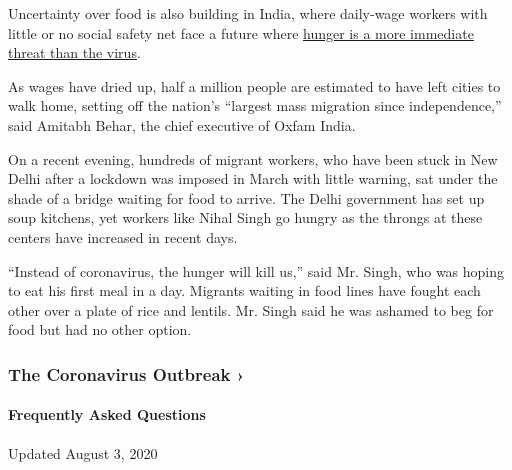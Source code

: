 Uncertainty over food is also building in India, where daily-wage
workers with little or no social safety net face a future where
\href{https://www.nytimes.com/2020/03/30/world/asia/coronavirus-india-lockdown.html}{hunger
is a more immediate threat than the virus}.

As wages have dried up, half a million people are estimated to have left
cities to walk home, setting off the nation's ``largest mass migration
since independence,'' said Amitabh Behar, the chief executive of Oxfam
India.

On a recent evening, hundreds of migrant workers, who have been stuck in
New Delhi after a lockdown was imposed in March with little warning, sat
under the shade of a bridge waiting for food to arrive. The Delhi
government has set up soup kitchens, yet workers like Nihal Singh go
hungry as the throngs at these centers have increased in recent days.

``Instead of coronavirus, the hunger will kill us,'' said Mr. Singh, who
was hoping to eat his first meal in a day. Migrants waiting in food
lines have fought each other over a plate of rice and lentils. Mr. Singh
said he was ashamed to beg for food but had no other option.

\href{https://www.nytimes.com/news-event/coronavirus?action=click\&pgtype=Article\&state=default\&region=MAIN_CONTENT_3\&context=storylines_faq}{}

\hypertarget{the-coronavirus-outbreak-}{%
\subsubsection{The Coronavirus Outbreak
›}\label{the-coronavirus-outbreak-}}

\hypertarget{frequently-asked-questions}{%
\paragraph{Frequently Asked
Questions}\label{frequently-asked-questions}}

Updated August 3, 2020

